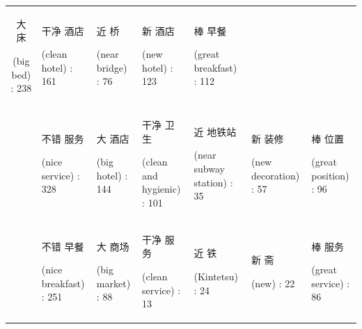 \documentclass[smallextended,natbib]{svjour3}       %
\begin{document}
\begin{landscape}
\begin{table}[p]
{\begin{tabular}{|c|l|l|l|l|l|l|}
          \begin{CJK}{UTF8}{gbsn}大 床\end{CJK} (big bed) : 238 &
          \begin{CJK}{UTF8}{gbsn}干净 酒店\end{CJK} (clean hotel) : 161 &
          \begin{CJK}{UTF8}{gbsn}近 桥\end{CJK} (near bridge) : 76 &
          \begin{CJK}{UTF8}{gbsn}新 酒店\end{CJK} (new hotel) : 123 &
          \begin{CJK}{UTF8}{gbsn}棒 早餐\end{CJK} (great breakfast) : 112 \\
         &
          \begin{CJK}{UTF8}{gbsn}不错 服务\end{CJK} (nice service) : 328 &
          \begin{CJK}{UTF8}{gbsn}大 酒店\end{CJK} (big hotel) : 144 &
          \begin{CJK}{UTF8}{gbsn}干净 卫生\end{CJK} (clean and hygienic) : 101 &
          \begin{CJK}{UTF8}{gbsn}近 地铁站\end{CJK} (near subway station) : 35 &
          \begin{CJK}{UTF8}{gbsn}新 装修\end{CJK} (new decoration) : 57 &
          \begin{CJK}{UTF8}{gbsn}棒 位置\end{CJK} (great position) : 96 \\
         &
          \begin{CJK}{UTF8}{gbsn}不错 早餐\end{CJK} (nice breakfast) : 251 &
          \begin{CJK}{UTF8}{gbsn}大 商场\end{CJK} (big market) : 88 &
          \begin{CJK}{UTF8}{gbsn}干净 服务\end{CJK} (clean service) : 13 &
          \begin{CJK}{UTF8}{gbsn}近 铁\end{CJK} (Kintetsu) : 24 &
          \begin{CJK}{UTF8}{gbsn}新 斋\end{CJK} (new) : 22 &
          \begin{CJK}{UTF8}{gbsn}棒 服务\end{CJK} (great service) : 86 \\ \hline

\end{tabular}}
\end{table}
\end{landscape}
\end{document}
